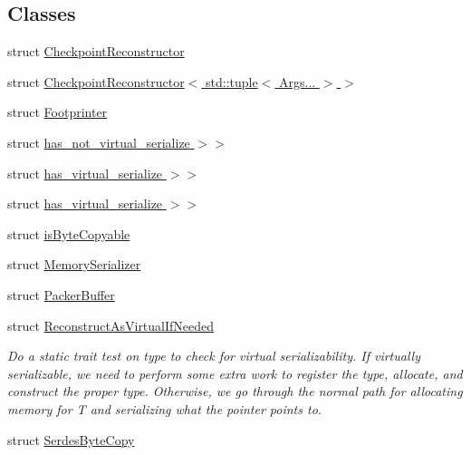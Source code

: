 \subsection*{Classes}
\begin{DoxyCompactItemize}
\item 
struct \hyperlink{structcheckpoint_1_1_checkpoint_reconstructor}{Checkpoint\+Reconstructor}
\item 
struct \hyperlink{structcheckpoint_1_1_checkpoint_reconstructor_3_01std_1_1tuple_3_01_args_8_8_8_01_4_01_4}{Checkpoint\+Reconstructor$<$ std\+::tuple$<$ Args... $>$ $>$}
\item 
struct \hyperlink{structcheckpoint_1_1_footprinter}{Footprinter}
\item 
struct \hyperlink{structcheckpoint_1_1_serialize_virtual_type_if_needed_3_01_t_00_01_serializer_t_00_01typename_01169395079d468e6ff618832a51e34843}{has\+\_\+not\+\_\+virtual\+\_\+serialize $>$$>$}
\item 
struct \hyperlink{structcheckpoint_1_1_reconstruct_as_virtual_if_needed_3_01_t_00_01_serializer_t_00_01typename_01ab92c606a95e76aaa723ec61628f6529}{has\+\_\+virtual\+\_\+serialize $>$$>$}
\item 
struct \hyperlink{structcheckpoint_1_1_serialize_virtual_type_if_needed_3_01_t_00_01_serializer_t_00_01typename_019c8f7fc8348eb3352805b18f8a3adb0b}{has\+\_\+virtual\+\_\+serialize $>$$>$}
\item 
struct \hyperlink{structcheckpoint_1_1is_byte_copyable}{is\+Byte\+Copyable}
\item 
struct \hyperlink{structcheckpoint_1_1_memory_serializer}{Memory\+Serializer}
\item 
struct \hyperlink{structcheckpoint_1_1_packer_buffer}{Packer\+Buffer}
\item 
struct \hyperlink{structcheckpoint_1_1_reconstruct_as_virtual_if_needed}{Reconstruct\+As\+Virtual\+If\+Needed}
\begin{DoxyCompactList}\small\item\em Do a static trait test on type to check for virtual serializability. If virtually serializable, we need to perform some extra work to register the type, allocate, and construct the proper type. Otherwise, we go through the normal path for allocating memory for T and serializing what the pointer points to. \end{DoxyCompactList}\item 
struct \hyperlink{structcheckpoint_1_1_serdes_byte_copy}{Serdes\+Byte\+Copy}
\item 

\end{DoxyCompactItemize}
